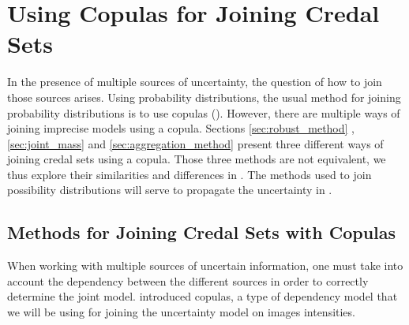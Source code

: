 \chapter{Using Copulas for Joining Credal Sets}\label{chap:joining_credal_sets}
In the presence of multiple sources of uncertainty, the question of how to join those sources arises. Using probability distributions, the usual method for joining probability distributions is to use copulas (). However, there are multiple ways of joining imprecise models using a copula. Sections \ref{sec:robust_method} , \ref{sec:joint_mass} and \ref{sec:aggregation_method} present three different ways of joining credal sets using a copula. Those three methods are not equivalent, we thus explore their similarities and differences in . The methods used to join possibility distributions will serve to propagate the uncertainty in .

\section{Methods for Joining Credal Sets with Copulas}\label{sec:methods_for_joining_credal_sets}
When working with multiple sources of uncertain information, one must take into account the dependency between the different sources in order to correctly determine the joint model.  introduced copulas, a type of dependency model that we will be using for joining the uncertainty model on images intensities. 

